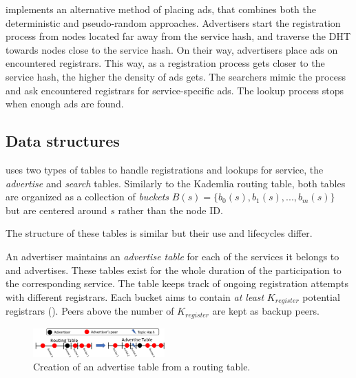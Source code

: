 \sysname implements an alternative method of placing ads, that combines both the deterministic and pseudo-random approaches.
Advertisers start the registration process from nodes located far away from the service hash, and traverse the DHT towards nodes close to the service hash.
On their way, advertisers place ads on encountered registrars.
This way, as a registration process gets closer to the service hash, the higher the density of ads gets.
The searchers mimic the process and ask encountered registrars for service-specific ads.
The lookup process stops when enough ads are found.

\subsection{Data structures}
\label{sec:struct}

\sysname uses two types of tables to handle registrations and lookups for service, the \emph{advertise} and \emph{search} tables.
Similarly to the Kademlia routing table, both tables are organized as a collection of \emph{buckets} $B(s) = \{b_0(s), b_1(s),..., b_m(s)\}$ but are centered around $s$ rather than the node ID.

The structure of these tables is similar but their use and lifecycles differ. 



An advertiser maintains an \emph{advertise table} for each of the services it belongs to and advertises.
These tables exist for the whole duration of the participation to the corresponding service.
The table keeps track of ongoing registration attempts with different registrars.
Each bucket aims to contain \emph{at least} $K_\textit{register}$ potential registrars ().
Peers above the number of $K_\textit{register}$ are kept as backup peers.

\begin{figure}
    \includegraphics[width=0.45\textwidth]{img/tables}
    \vspace{-0.05in}
    \caption{Creation of an advertise table from a routing table.} %
    \label{fig:advertise_table}
    \vspace{-0.15in}
\end{figure}

